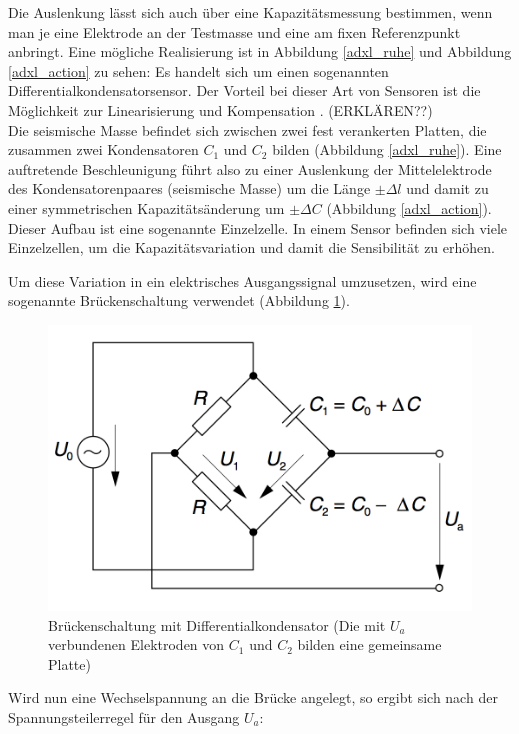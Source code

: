 \documentclass[12pt,a4paper]{scrartcl}
\begin{document}
Die Auslenkung lässt sich auch über eine Kapazitätsmessung bestimmen, wenn man je eine Elektrode an der Testmasse und eine am fixen Referenzpunkt anbringt.\citep{S.J.-Sherman:1992ul} Eine mögliche Realisierung ist in Abbildung \ref{adxl_ruhe} und Abbildung \ref{adxl_action} zu sehen: Es handelt sich um einen sogenannten Differentialkondensatorsensor. Der Vorteil bei dieser Art von Sensoren ist die Möglichkeit zur Linearisierung und Kompensation \citep{:2002fk}. (ERKLÄREN??) \\
Die seismische Masse befindet sich zwischen zwei fest verankerten Platten, die zusammen zwei Kondensatoren $C_1$ und $C_2$ bilden (Abbildung \ref{adxl_ruhe}). Eine auftretende Beschleunigung führt also zu einer Auslenkung der Mittelelektrode des Kondensatorenpaares (seismische Masse) um die Länge $\pm \Delta l$ und damit zu einer symmetrischen Kapazitätsänderung um $\pm \Delta C$ (Abbildung \ref{adxl_action}). Dieser Aufbau ist eine sogenannte Einzelzelle. In einem Sensor befinden sich viele Einzelzellen, um die Kapazitätsvariation und damit die Sensibilität zu erhöhen.

Um diese Variation in ein elektrisches Ausgangssignal umzusetzen, wird eine sogenannte Brückenschaltung verwendet (Abbildung \ref{bruecke}).

\begin{figure}[H]
\centering
\includegraphics[scale=2]{schaltung_beschleunigungssensor.png}
\caption{Brückenschaltung mit Differentialkondensator (Die mit $U_a$ verbundenen Elektroden von $C_1$ und $C_2$ bilden eine gemeinsame Platte) \citep{:2002fk}}
\label{bruecke}
\end{figure}

Wird nun eine Wechselspannung an die Brücke angelegt, so ergibt sich nach der Spannungsteilerregel für den Ausgang $U_a$:
\end{document}
